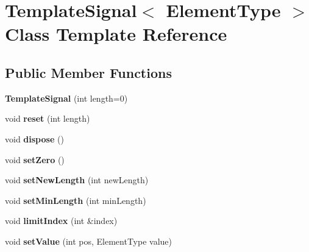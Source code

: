 \hypertarget{class_template_signal}{}\section{Template\+Signal$<$ Element\+Type $>$ Class Template Reference}
\label{class_template_signal}
\subsection*{Public Member Functions}
\begin{DoxyCompactItemize}
\item 
\mbox{\label{class_template_signal_a04d1812982aec97c0caaa178c273ee07}} 
{\bfseries Template\+Signal} (int length=0)
\item 
\mbox{\label{class_template_signal_afad93fdf41ac245ba539f11ae0419148}} 
void {\bfseries reset} (int length)
\item 
\mbox{\label{class_template_signal_ac9693816790115804257645d00fbb256}} 
void {\bfseries dispose} ()
\item 
\mbox{\label{class_template_signal_ab41edef59c9edb11be50a8b151b66f12}} 
void {\bfseries set\+Zero} ()
\item 
\mbox{\label{class_template_signal_acc915b04d12ce99bae58799538286b7d}} 
void {\bfseries set\+New\+Length} (int new\+Length)
\item 
\mbox{\label{class_template_signal_ae068fdbd1b9b53cbd6778b1e109ee6fd}} 
void {\bfseries set\+Min\+Length} (int min\+Length)
\item 
\mbox{\label{class_template_signal_abeb24ec605626667f4c214292ba3833f}} 
void {\bfseries limit\+Index} (int \&index)
\item 
\mbox{\label{class_template_signal_ab47f1298e1c65c551284fe6d3c157e91}} 
void {\bfseries set\+Value} (int pos, Element\+Type value)
\item 
\mbox{\label{class_template_signal_a9e4cb09405cc999e5a8d0ebce6f704d3}} 

\end{DoxyCompactItemize}
